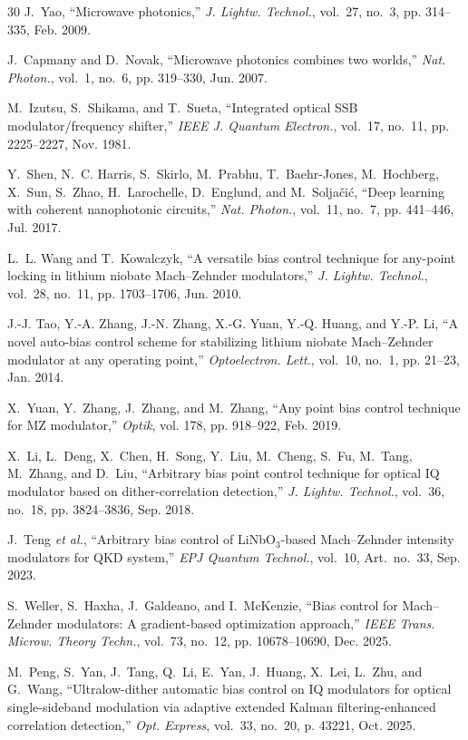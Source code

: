 \documentclass[journal]{IEEEtran}
\theoremstyle{plain}
\theoremstyle{remark}
\begin{document}
\begin{thebibliography}{30}
J.~Yao, ``Microwave photonics,'' \emph{J. Lightw. Technol.}, vol.~27,
no.~3, pp. 314--335, Feb. 2009.

J.~Capmany and D.~Novak, ``Microwave photonics combines two worlds,''
\emph{Nat. Photon.}, vol.~1, no.~6, pp. 319--330, Jun. 2007.

M.~Izutsu, S.~Shikama, and T.~Sueta, ``Integrated optical {SSB}
modulator/frequency shifter,'' \emph{IEEE J. Quantum Electron.},
vol.~17, no.~11, pp. 2225--2227, Nov. 1981.

Y.~Shen, N.~C. Harris, S.~Skirlo, M.~Prabhu, T.~Baehr-Jones, M.~Hochberg,
X.~Sun, S.~Zhao, H.~Larochelle, D.~Englund, and M.~Solja\v{c}i\'c,
``Deep learning with coherent nanophotonic circuits,''
\emph{Nat. Photon.}, vol.~11, no.~7, pp. 441--446, Jul. 2017.

L.~L. Wang and T.~Kowalczyk, ``A versatile bias control technique for
any-point locking in lithium niobate {Mach--Zehnder} modulators,''
\emph{J. Lightw. Technol.}, vol.~28, no.~11, pp. 1703--1706, Jun. 2010.

J.-J. Tao, Y.-A. Zhang, J.-N. Zhang, X.-G. Yuan, Y.-Q. Huang, and Y.-P. Li,
``A novel auto-bias control scheme for stabilizing lithium niobate
{Mach--Zehnder} modulator at any operating point,''
\emph{Optoelectron. Lett.}, vol.~10, no.~1, pp. 21--23, Jan. 2014.

X.~Yuan, Y.~Zhang, J.~Zhang, and M.~Zhang, ``Any point bias control
technique for {MZ} modulator,'' \emph{Optik}, vol. 178, pp. 918--922,
Feb. 2019.

X.~Li, L.~Deng, X.~Chen, H.~Song, Y.~Liu, M.~Cheng, S.~Fu, M.~Tang,
M.~Zhang, and D.~Liu, ``Arbitrary bias point control technique for optical
{IQ} modulator based on dither-correlation detection,''
\emph{J. Lightw. Technol.}, vol.~36, no.~18, pp. 3824--3836, Sep. 2018.

J.~Teng \emph{et al.}, ``Arbitrary bias control of {LiNbO$_3$}-based
{Mach--Zehnder} intensity modulators for {QKD} system,''
\emph{EPJ Quantum Technol.}, vol.~10, Art.~no.~33, Sep. 2023.

S.~Weller, S.~Haxha, J.~Galdeano, and I.~McKenzie, ``Bias control for
{Mach--Zehnder} modulators: A gradient-based optimization approach,''
\emph{IEEE Trans. Microw. Theory Techn.}, vol.~73, no.~12,
pp. 10678--10690, Dec. 2025.

M.~Peng, S.~Yan, J.~Tang, Q.~Li, E.~Yan, J.~Huang, X.~Lei, L.~Zhu, and
G.~Wang, ``Ultralow-dither automatic bias control on {IQ} modulators for
optical single-sideband modulation via adaptive extended {Kalman}
filtering-enhanced correlation detection,'' \emph{Opt. Express},
vol.~33, no.~20, p. 43221, Oct. 2025.


\end{thebibliography}
\end{document}
